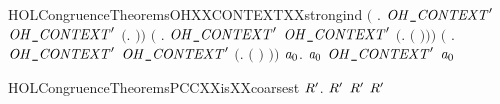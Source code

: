 \begin{SaveVerbatim}{HOLCongruenceTheoremsOHXXCONTEXTXXstrongind}
       \ensuremath{(}\HOLSymConst{\HOLTokenForall{}} .
              \HOLSymConst{\HOLTokenConj{}} \ensuremath{\HOLBoundVar{OH\HOLTokenUnderscore{}CONTEXT}\sp{\prime}}  \HOLSymConst{\HOLTokenImp{}}
            \ensuremath{\HOLBoundVar{OH\HOLTokenUnderscore{}CONTEXT}\sp{\prime}} \ensuremath{(}\HOLTokenLambda{}.  \HOLSymConst{\ensuremath{\mid}}  \ensuremath{)}\ensuremath{)} \HOLSymConst{\HOLTokenConj{}}
       \ensuremath{(}\HOLSymConst{\HOLTokenForall{}} .
              \HOLSymConst{\HOLTokenConj{}} \ensuremath{\HOLBoundVar{OH\HOLTokenUnderscore{}CONTEXT}\sp{\prime}}  \HOLSymConst{\HOLTokenImp{}}
            \ensuremath{\HOLBoundVar{OH\HOLTokenUnderscore{}CONTEXT}\sp{\prime}} \ensuremath{(}\HOLTokenLambda{}.   \ensuremath{(} \ensuremath{)}\ensuremath{)}\ensuremath{)} \HOLSymConst{\HOLTokenConj{}}
       \ensuremath{(}\HOLSymConst{\HOLTokenForall{}} .
              \HOLSymConst{\HOLTokenConj{}} \ensuremath{\HOLBoundVar{OH\HOLTokenUnderscore{}CONTEXT}\sp{\prime}}  \HOLSymConst{\HOLTokenImp{}}
            \ensuremath{\HOLBoundVar{OH\HOLTokenUnderscore{}CONTEXT}\sp{\prime}} \ensuremath{(}\HOLTokenLambda{}.  \ensuremath{(} \ensuremath{)} \ensuremath{)}\ensuremath{)} \HOLSymConst{\HOLTokenImp{}}
       \HOLSymConst{\HOLTokenForall{}}\ensuremath{\HOLBoundVar{a}\sb{\mathrm{0}}}.  \ensuremath{\HOLBoundVar{a}\sb{\mathrm{0}}} \HOLSymConst{\HOLTokenImp{}} \ensuremath{\HOLBoundVar{OH\HOLTokenUnderscore{}CONTEXT}\sp{\prime}} \ensuremath{\HOLBoundVar{a}\sb{\mathrm{0}}}
\end{SaveVerbatim}
\newcommand{\HOLCongruenceTheoremsOHXXCONTEXTXXstrongind}{\UseVerbatim{HOLCongruenceTheoremsOHXXCONTEXTXXstrongind}}
\begin{SaveVerbatim}{HOLCongruenceTheoremsPCCXXisXXcoarsest}
\HOLTokenTurnstile{} \HOLSymConst{\HOLTokenForall{}} \ensuremath{\HOLBoundVar{R}\sp{\prime}}.  \ensuremath{\HOLBoundVar{R}\sp{\prime}} \HOLSymConst{\HOLTokenConj{}} \ensuremath{\HOLBoundVar{R}\sp{\prime}}   \HOLSymConst{\HOLTokenImp{}} \ensuremath{\HOLBoundVar{R}\sp{\prime}}   
\end{SaveVerbatim}
